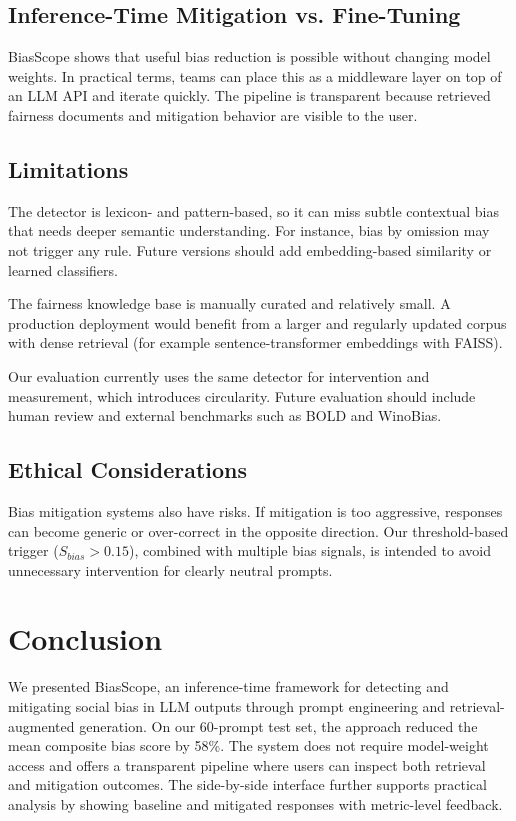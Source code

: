 \documentclass[conference]{IEEEtran}
\begin{document}
\subsection{Inference-Time Mitigation vs. Fine-Tuning}

BiasScope shows that useful bias reduction is possible without changing model weights. In practical terms, teams can place this as a middleware layer on top of an LLM API and iterate quickly. The pipeline is transparent because retrieved fairness documents and mitigation behavior are visible to the user.

\subsection{Limitations}

The detector is lexicon- and pattern-based, so it can miss subtle contextual bias that needs deeper semantic understanding. For instance, bias by omission may not trigger any rule. Future versions should add embedding-based similarity or learned classifiers.

The fairness knowledge base is manually curated and relatively small. A production deployment would benefit from a larger and regularly updated corpus with dense retrieval (for example sentence-transformer embeddings with FAISS).

Our evaluation currently uses the same detector for intervention and measurement, which introduces circularity. Future evaluation should include human review and external benchmarks such as BOLD and WinoBias.

\subsection{Ethical Considerations}

Bias mitigation systems also have risks. If mitigation is too aggressive, responses can become generic or over-correct in the opposite direction. Our threshold-based trigger ($S_{bias} > 0.15$), combined with multiple bias signals, is intended to avoid unnecessary intervention for clearly neutral prompts.

\section{Conclusion}

We presented BiasScope, an inference-time framework for detecting and mitigating social bias in LLM outputs through prompt engineering and retrieval-augmented generation. On our 60-prompt test set, the approach reduced the mean composite bias score by 58\%. The system does not require model-weight access and offers a transparent pipeline where users can inspect both retrieval and mitigation outcomes. The side-by-side interface further supports practical analysis by showing baseline and mitigated responses with metric-level feedback.
\end{document}
